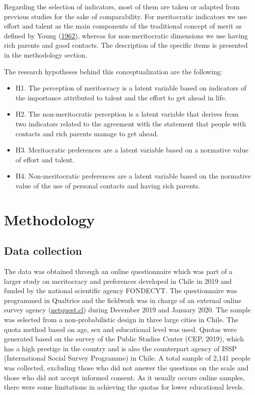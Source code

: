 \documentclass[
]{article}
\begin{document}
Regarding the selection of indicators, most of them are taken or adapted
from previous studies for the sake of comparability. For meritocratic
indicators we use effort and talent as the main components of the
traditional concept of merit as defined by Young
(\protect\hyperlink{ref-young_rise_1962}{1962}), whereas for
non-meritocratic dimensions we use having rich parents and good
contacts. The description of the specific items is presented in the
methodology section.

The research hypotheses behind this conceptualization are the following:

\begin{itemize}
\item
  H1. The perception of meritocracy is a latent variable based on
  indicators of the importance attributed to talent and the effort to
  get ahead in life.
\item
  H2. The non-meritocratic perception is a latent variable that derives
  from two indicators related to the agreement with the statement that
  people with contacts and rich parents manage to get ahead.
\item
  H3. Meritocratic preferences are a latent variable based on a
  normative value of effort and talent.
\item
  H4. Non-meritocratic preferences are a latent variable based on the
  normative value of the use of personal contacts and having rich
  parents.
\end{itemize}

\hypertarget{methodology}{%
\section{Methodology}\label{methodology}}

\hypertarget{data-collection}{%
\subsection{Data collection}\label{data-collection}}

The data was obtained through an online questionnaire which was part of
a larger study on meritocracy and preferences developed in Chile in 2019
and funded by the national scientific agency FONDECYT. The questionnaire
was programmed in Qualtrics and the fieldwork was in charge of an
external online survey agency (\href{www.netquest.cl}{netquest.cl})
during December 2019 and January 2020. The sample was selected from a
non-probabilistic design in three large cities in Chile. The quota
method based on age, sex and educational level was used. Quotas were
generated based on the survey of the Public Studies Center (CEP, 2019),
which has a high prestige in the country and is also the counterpart
agency of ISSP (International Social Survey Programme) in Chile. A total
sample of 2,141 people was collected, excluding those who did not answer
the questions on the scale and those who did not accept informed
consent. As it usually occurs online samples, there were some
limitations in achieving the quotas for lower educational levels.
\end{document}
